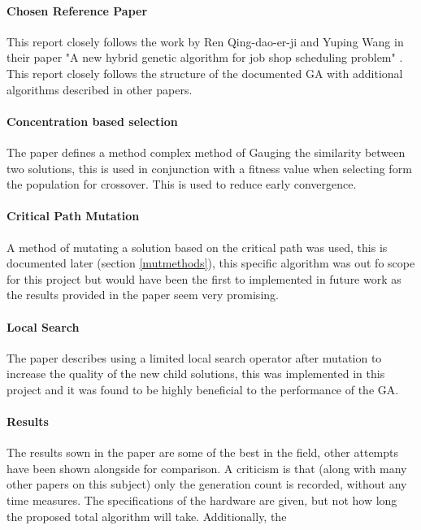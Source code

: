 \documentclass[14pt]{acmsiggraph}
\begin{document}
	\paragraph{Chosen Reference Paper}
	This report closely follows the work by Ren Qing-dao-er-ji and Yuping Wang in their paper "A new hybrid genetic algorithm for job shop scheduling problem" \cite{wang2012new}. This report closely follows the structure of the documented GA with additional algorithms described in other papers.
	
	\paragraph{Concentration based selection}
	The paper defines a method complex method of Gauging the similarity between two solutions, this is used in conjunction with a fitness value when selecting form the population for crossover. This is used to reduce early convergence. 
	
	\paragraph{Critical Path Mutation}
	A method of mutating a solution based on the critical path was used, this is documented later (section \ref{mutmethods}), this specific algorithm was out fo scope for this project but would have been the first to implemented in future work as the results provided in the paper seem very promising.
	
	\paragraph{Local Search}
	The paper describes using a limited local search operator after mutation to increase the quality of the new child solutions, this was implemented in this project and it was found to be highly beneficial to the performance of the GA.
	
	\paragraph{Results}
	The results sown in the paper are some of the best in the field, other attempts have been shown alongside for  comparison.
	A criticism is that (along with many other papers on this subject) only the generation count is recorded, without any time measures. The specifications of the hardware are given, but not how long the proposed total algorithm will take. Additionally, the 
	
\end{document}
